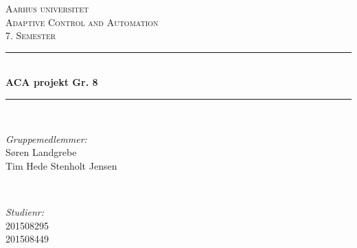 


	\begin{titlepage}
	
	
	
	\newcommand{\HRule}{\rule{\linewidth}{0.5mm}} %
	\setlength{\topmargin}{0in}
	\centering %
	
	\textsc{\LARGE Aarhus universitet}\\[1.5cm] %
	\textsc{\Large Adaptive Control and Automation}\\[0.5cm] %
	\textsc{\large 7. Semester}\\[0.5cm] %
	
	
	\HRule \\[0.4cm]
	{ \huge \bfseries ACA projekt Gr. 8}\\ %
	\HRule \\[1cm]
	
	
	\begin{minipage}{0.4\textwidth}
		\begin{flushleft} \large
			\emph{Gruppemedlemmer:}\\
			Søren Landgrebe \\
			Tim Hede Stenholt Jensen \\
		\end{flushleft}
	\end{minipage}
	~
	\begin{minipage}{0.4\textwidth}
		\begin{flushright} \large
			\emph{Studienr:} \\
			201508295\\
			201508449\
		\end{flushright}
	\end{minipage}\\[5cm]
	

\end{titlepage}
